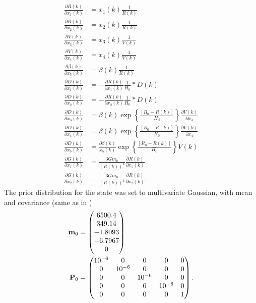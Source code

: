 \begin{equation}
\begin{split}
%
\frac{\partial R(k)}{\partial x_1(k)} & = x_1(k) \frac{1}{R(k)} \\
\frac{\partial R(k)}{\partial x_2(k)} & = x_2(k) \frac{1}{R(k)} \\
\frac{\partial V(k)}{\partial x_3(k)} & = x_3(k) \frac{1}{V(k)} \\
\frac{\partial V(k)}{\partial x_4(k)} & = x_4(k) \frac{1}{V(k)} \\
\frac{\partial \beta(k)}{\partial x_5(k)} & = \beta(k)\frac{1}{R(k)}
\\ \frac{\partial D(k)}{\partial x_1(k)} & = -\frac{\partial
R(k)}{\partial x_1(k)} \frac{1}{H_0} * D(k) \\ \frac{\partial
D(k)}{\partial x_2(k)} & = -\frac{\partial R(k)}{\partial x_2(k)}
\frac{1}{H_0} * D(k) \\ \frac{\partial D(k)}{\partial x_3(k)} & =
\beta(k) \exp \left\{ \frac{[R_0 - R(k)]}{H_0}\right\} \frac{\partial
V(k)}{\partial x_3} \\ \frac{\partial D(k)}{\partial x_4(k)} & =
\beta(k) \exp \left\{ \frac{[R_0 - R(k)]}{H_0}\right\} \frac{\partial
V(k)}{\partial x_4} \\ \frac{\partial D(k)}{\partial x_5(k)} & =
\frac{\partial \beta(k)}{x_5(k)} \exp \left\{ \frac{[R_0 -
R(k)]}{H_0}\right\} V(k) \\ \frac{\partial G(k)}{\partial x_1(k)} & =
\frac{3 Gm_0}{(R(k))^4} \frac{\partial R(k)}{\partial x_1(k)} \\
\frac{\partial G(k)}{\partial x_2(k)} & = \frac{3 Gm_0}{(R(k))^4}
\frac{\partial R(k)}{\partial x_2(k)}.
%
\end{split}
\end{equation}
%
The prior distribution for the state was set to multivariate Gaussian,
with mean and covariance (same as in \citet{Julier+Uhlmann:2004})
%
\begin{equation}
\begin{split}
%
\vec{m}_0 & = \begin{pmatrix} 6500.4 \\ 349.14 \\ -1.8093 \\ -6.7967
\\ 0 \\
\end{pmatrix} \\ \mat{P}_0 & = \begin{pmatrix} 10^{-6} & 0 & 0 & 0 & 0
\\ 0 & 10^{-6}& 0 & 0 & 0 \\ 0 & 0 & 10^{-6} & 0 & 0 \\ 0 & 0 & 0 &
10^{-6}& 0 \\ 0 & 0 & 0 & 0 & 1
\end{pmatrix}.
%
\end{split}
\end{equation}
